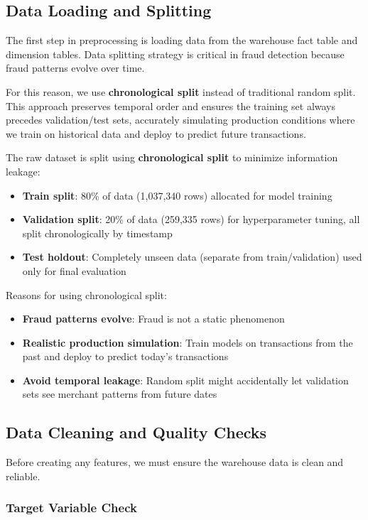 \subsection{Data Loading and Splitting}

The first step in preprocessing is loading data from the warehouse fact table and dimension tables. Data splitting strategy is critical in fraud detection because fraud patterns evolve over time.

For this reason, we use \textbf{chronological split} instead of traditional random split. This approach preserves temporal order and ensures the training set always precedes validation/test sets, accurately simulating production conditions where we train on historical data and deploy to predict future transactions.

The raw dataset is split using \textbf{chronological split} to minimize information leakage:
\begin{itemize}
    \item \textbf{Train split}: 80\% of data (1,037,340 rows) allocated for model training
    \item \textbf{Validation split}: 20\% of data (259,335 rows) for hyperparameter tuning, all split chronologically by timestamp
    \item \textbf{Test holdout}: Completely unseen data (separate from train/validation) used only for final evaluation
\end{itemize}

Reasons for using chronological split:
\begin{itemize}
    \item \textbf{Fraud patterns evolve}: Fraud is not a static phenomenon
    \item \textbf{Realistic production simulation}: Train models on transactions from the past and deploy to predict today's transactions
    \item \textbf{Avoid temporal leakage}: Random split might accidentally let validation sets see merchant patterns from future dates
\end{itemize}

\subsection{Data Cleaning and Quality Checks}

Before creating any features, we must ensure the warehouse data is clean and reliable.

\subsubsection{Target Variable Check}

